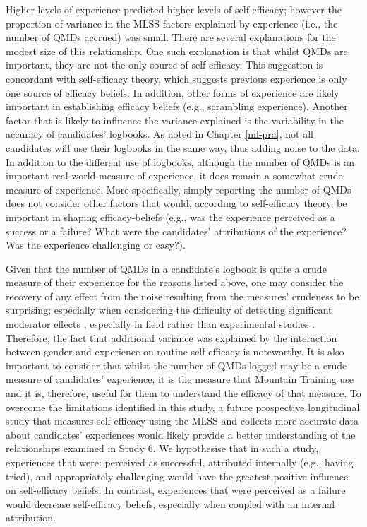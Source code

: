 \documentclass[
  12pt,
  a4paper,
]{book}
\begin{document}
Higher levels of experience predicted higher levels of self-efficacy; however the proportion of variance in the MLSS factors explained by experience (i.e., the number of QMDs accrued) was small. There are several explanations for the modest size of this relationship. One such explanation is that whilst QMDs are important, they are not the only source of self-efficacy. This suggestion is concordant with self-efficacy theory, which suggests previous experience is only one source of efficacy beliefs. In addition, other forms of experience are likely important in establishing efficacy beliefs (e.g., scrambling experience). Another factor that is likely to influence the variance explained is the variability in the accuracy of candidates' logbooks. As noted in Chapter \ref{ml-pra}, not all candidates will use their logbooks in the same way, thus adding noise to the data. In addition to the different use of logbooks, although the number of QMDs is an important real-world measure of experience, it does remain a somewhat crude measure of experience. More specifically, simply reporting the number of QMDs does not consider other factors that would, according to self-efficacy theory, be important in shaping efficacy-beliefs (e.g., was the experience perceived as a success or a failure? What were the candidates' attributions of the experience? Was the experience challenging or easy?).

Given that the number of QMDs in a candidate's logbook is quite a crude measure of their experience for the reasons listed above, one may consider the recovery of any effect from the noise resulting from the measures' crudeness to be surprising; especially when considering the difficulty of detecting significant moderator effects \citep{Evans1985}, especially in field rather than experimental studies \citep{McClelland1993}. Therefore, the fact that additional variance was explained by the interaction between gender and experience on routine self-efficacy is noteworthy. It is also important to consider that whilst the number of QMDs logged may be a crude measure of candidates' experience; it is the measure that Mountain Training use and it is, therefore, useful for them to understand the efficacy of that measure. To overcome the limitations identified in this study, a future prospective longitudinal study that measures self-efficacy using the MLSS and collects more accurate data about candidates' experiences would likely provide a better understanding of the relationships examined in Study 6. We hypothesise that in such a study, experiences that were: perceived as successful, attributed internally (e.g., having tried), and appropriately challenging would have the greatest positive influence on self-efficacy beliefs. In contrast, experiences that were perceived as a failure would decrease self-efficacy beliefs, especially when coupled with an internal attribution.
\end{document}
